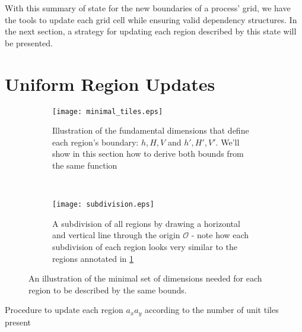 With this summary of state for the new boundaries of a process'
 grid, we have the tools to update each grid cell while
 ensuring valid dependency structures.
In the next section, a strategy for updating each region described
by this state will be presented.

\section{Uniform Region Updates}

\begin{figure}[ht]
  \centering
  \begin{subfigure}[ht]{.5\textwidth}
    \centering
    \texttt{[image: minimal\_tiles.eps]}
    \caption{Illustration of the fundamental dimensions that define each region's boundary: $h,H,V$ and
    $h',H',V'$.  We'll show in this section how to derive both bounds from the same function}\label{subfig:mintile}
  \end{subfigure}
  ~
  \begin{subfigure}[ht]{.4\textwidth}
    \centering
    \texttt{[image: subdivision.eps]}
    \caption{A subdivision of all regions by drawing a horizontal and vertical line through the origin
    $\mathcal{O}$ - note how each subdivision of each region looks very similar to the regions
    annotated in \ref{subfig:mintile}}
    \label{subfig:subdivision}
    \end{subfigure}
  \caption{An illustration of the minimal set of dimensions needed for each region to be described by the same
  bounds.}
  \label{fig:tiles}
\end{figure}

\begin{algorithm}[h]
  \setcounter{AlgoLine}{0}
  \caption{Procedure to update each region $a_xa_y$ according to the number of unit tiles present}
  \label{alg:tile_update}
\end{algorithm}


